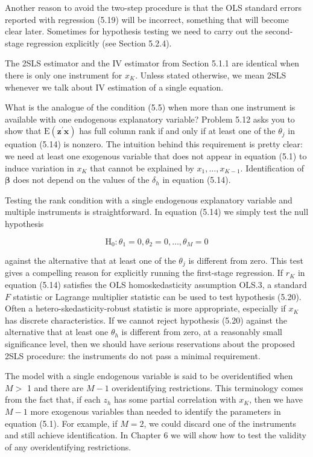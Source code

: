 \documentclass[10pt]{article}
\begin{document}
Another reason to avoid the two-step procedure is that the OLS standard errors reported with regression (5.19) will be incorrect, something that will become clear later. Sometimes for hypothesis testing we need to carry out the second-stage regression explicitly (see Section 5.2.4).

The 2SLS estimator and the IV estimator from Section 5.1.1 are identical when there is only one instrument for $x_{K}$. Unless stated otherwise, we mean 2SLS whenever we talk about IV estimation of a single equation.

What is the analogue of the condition (5.5) when more than one instrument is available with one endogenous explanatory variable? Problem 5.12 asks you to show that $\mathrm{E}\left(\mathbf{z}^{\prime} \mathbf{x}\right)$ has full column rank if and only if at least one of the $\theta_{j}$ in equation (5.14) is nonzero. The intuition behind this requirement is pretty clear: we need at least one exogenous variable that does not appear in equation (5.1) to induce variation in $x_{K}$ that cannot be explained by $x_{1}, \ldots, x_{K-1}$. Identification of $\boldsymbol{\beta}$ does not depend on the values of the $\delta_{h}$ in equation (5.14).

Testing the rank condition with a single endogenous explanatory variable and multiple instruments is straightforward. In equation (5.14) we simply test the null hypothesis


\begin{equation*}
\mathrm{H}_{0}: \theta_{1}=0, \theta_{2}=0, \ldots, \theta_{M}=0 \tag{5.20}
\end{equation*}


against the alternative that at least one of the $\theta_{j}$ is different from zero. This test gives a compelling reason for explicitly running the first-stage regression. If $r_{K}$ in equation (5.14) satisfies the OLS homoskedasticity assumption OLS.3, a standard $F$ statistic or Lagrange multiplier statistic can be used to test hypothesis (5.20). Often a hetero-skedasticity-robust statistic is more appropriate, especially if $x_{K}$ has discrete characteristics. If we cannot reject hypothesis (5.20) against the alternative that at least one $\theta_{h}$ is different from zero, at a reasonably small significance level, then we should have serious reservations about the proposed 2SLS procedure: the instruments do not pass a minimal requirement.

The model with a single endogenous variable is said to be overidentified when $M>$ 1 and there are $M-1$ overidentifying restrictions. This terminology comes from the fact that, if each $z_{h}$ has some partial correlation with $x_{K}$, then we have $M-1$ more exogenous variables than needed to identify the parameters in equation (5.1). For example, if $M=2$, we could discard one of the instruments and still achieve identification. In Chapter 6 we will show how to test the validity of any overidentifying restrictions.
\end{document}
